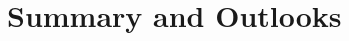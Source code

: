 \documentclass[aps,prl,twocolumn,groupedaddress]{revtex4-1}
\begin{document}
\section{Summary and Outlooks}

%



%
\end{document}
